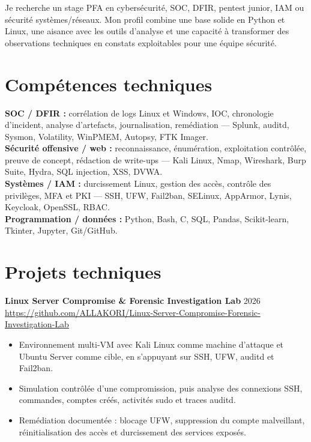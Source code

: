\documentclass[10pt,a4paper]{article}
\begin{document}
Je recherche un stage PFA en cybersécurité, SOC, DFIR, pentest junior, IAM ou sécurité systèmes/réseaux. Mon profil combine une base solide en Python et Linux, une aisance avec les outils d'analyse et une capacité à transformer des observations techniques en constats exploitables pour une équipe sécurité.

\section{Compétences techniques}
\textbf{SOC / DFIR :} corrélation de logs Linux et Windows, IOC, chronologie d'incident, analyse d'artefacts, journalisation, remédiation --- Splunk, auditd, Sysmon, Volatility, WinPMEM, Autopsy, FTK Imager.\\
\textbf{Sécurité offensive / web :} reconnaissance, énumération, exploitation contrôlée, preuve de concept, rédaction de write-ups --- Kali Linux, Nmap, Wireshark, Burp Suite, Hydra, SQL injection, XSS, DVWA.\\
\textbf{Systèmes / IAM :} durcissement Linux, gestion des accès, contrôle des privilèges, MFA et PKI --- SSH, UFW, Fail2ban, SELinux, AppArmor, Lynis, Keycloak, OpenSSL, RBAC.\\
\textbf{Programmation / données :} Python, Bash, C, SQL, Pandas, Scikit-learn, Tkinter, Jupyter, Git/GitHub.

\section{Projets techniques}
\textbf{Linux Server Compromise \& Forensic Investigation Lab} \hfill 2026\\
\href{https://github.com/ALLAKORI/Linux-Server-Compromise-Forensic-Investigation-Lab}{https://github.com/ALLAKORI/Linux-Server-Compromise-Forensic-Investigation-Lab}
\begin{itemize}
  \item Environnement multi-VM avec Kali Linux comme machine d'attaque et Ubuntu Server comme cible, en s'appuyant sur SSH, UFW, auditd et Fail2ban.
  \item Simulation contrôlée d'une compromission, puis analyse des connexions SSH, commandes, comptes créés, activités sudo et traces auditd.
  \item Remédiation documentée : blocage UFW, suppression du compte malveillant, réinitialisation des accès et durcissement des services exposés.
\end{itemize}
\end{document}
